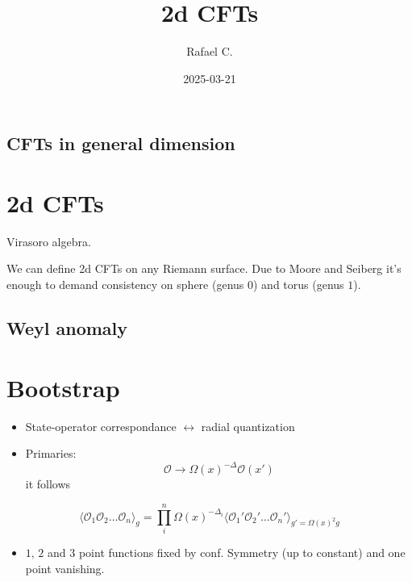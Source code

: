 \documentclass[10pt,
 article,
 amsmath,amssymb
]{revtex4-2}
\begin{document}
\title{2d CFTs}



\author{Rafael C.}




\date{2025-03-21}







\maketitle

\tableofcontents



\subsection{CFTs in general dimension}


\section{2d CFTs}

Virasoro algebra.

We can define 2d CFTs on any Riemann surface. Due to Moore and Seiberg it's enough to demand consistency on sphere (genus $0$) and torus (genus $1$).

\subsection{Weyl anomaly}

\section{Bootstrap}
\begin{itemize}
    \item     State-operator correspondance $\leftrightarrow$ radial quantization
    \item Primaries: $$\mathcal{O}\to \Omega(x)^{-\Delta} \mathcal{O}(x')$$ it follows
\end{itemize}
$$\langle \mathcal{O}_1 \mathcal{O}_2\dots \mathcal{O}_n \rangle_g =\prod_{i}^{n} \Omega(x)^{-\Delta_i} \langle \mathcal{O}_1' \mathcal{O}_2'\dots \mathcal{O}_n' \rangle_{g'=\Omega(x)^2 g}$$
\begin{itemize}
    \item $1,\, 2$ and $3$ point functions fixed by conf. Symmetry (up to constant) and one point vanishing.
\end{itemize}
\end{document}
